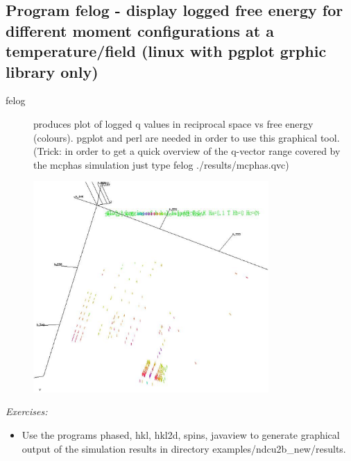 \subsection{Program {\prg felog} - display logged free energy for different moment configurations %
at a temperature/field (linux with pgplot grphic library only)}

\begin{description} 
\item [felog]                  produces plot of logged q values in reciprocal
space vs free energy (colours). {\prg pgplot} and {\prg perl} are needed in order
to use this graphical tool.
(Trick: in order to get a quick overview of the
q-vector range covered by the mcphas simulation just type {\prg felog ./results/mcphas.qvc})
\end{description} 

\begin{figure}[hb]%
\begin{center}\leavevmode
\includegraphics[angle=0, width=0.8\textwidth]{../demo/pictures/felog.eps}
\end{center}
\end{figure}

\vspace{1cm}
{\em Exercises:}
\begin{itemize}
\item Use the programs {\prg phased, hkl, hkl2d, spins, javaview} to generate
graphical output of the simulation results in directory 
{\prg examples/ndcu2b\_new/results}.
\end{itemize}


